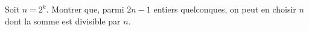 Soit $n = 2^k$. Montrer que, parmi $2n - 1$ entiers quelconques, on peut en choisir $n$ dont la somme est divisible par $n$.
